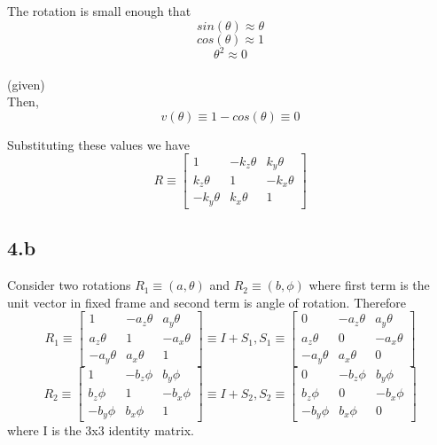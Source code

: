 \documentclass[12pt]{article}
\newcommand{\given}{{\\ \color{blue} \hspace*{\fill}(given)} \\}
\begin{document}
The rotation is small enough that
\[
  sin(\theta) \approx \theta
\]
\[
  cos(\theta) \approx 1
\]
\[
  \theta^2 \approx 0
\]
\given

Then,
\[
  v(\theta) \equiv 1 - cos(\theta) \equiv 0
\]

Substituting these values we have
\[
  R \equiv
  \begin{bmatrix}
    1 & -k_z\theta & k_y\theta\\
     k_z\theta & 1 & -k_x\theta \\
     -k_y\theta & k_x\theta & 1
  \end{bmatrix}
\]
\pagebreak

\subsection*{4.b}
Consider two rotations $R_1 \equiv (a, \theta)$ and $R_2 \equiv (b, \phi)$ where first term is the unit vector in fixed frame and second term is angle of rotation.
Therefore
\[
  R_1 \equiv
  \begin{bmatrix}
    1 & -a_z\theta & a_y\theta\\
     a_z\theta & 1 & -a_x\theta \\
     -a_y\theta & a_x\theta & 1
  \end{bmatrix}
  \equiv
  I + S_1
  ,
  S_1 \equiv
  \begin{bmatrix}
    0 & -a_z\theta & a_y\theta\\
     a_z\theta & 0 & -a_x\theta \\
     -a_y\theta & a_x\theta & 0
  \end{bmatrix}
\]
\[
  R_2 \equiv
  \begin{bmatrix}
    1 & -b_z\phi & b_y\phi\\
     b_z\phi & 1 & -b_x\phi \\
     -b_y\phi & b_x\phi & 1
  \end{bmatrix}
  \equiv
  I + S_2
  ,
  S_2 \equiv
  \begin{bmatrix}
    0 & -b_z\phi & b_y\phi\\
     b_z\phi & 0 & -b_x\phi \\
     -b_y\phi & b_x\phi & 0
  \end{bmatrix}
\]
where I is the 3x3 identity matrix.
\end{document}
